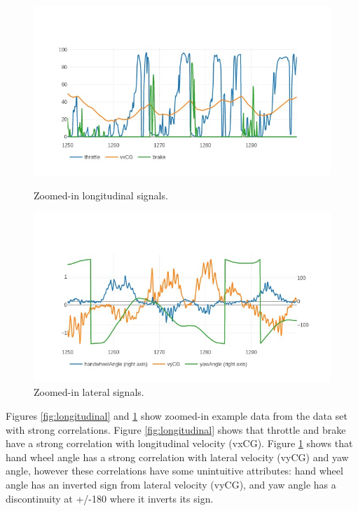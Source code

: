 \documentclass{article}
\begin{document}
\begin{figure}[h!]
  \centering
  \begin{minipage}[b]{0.49\textwidth}
    \includegraphics[width=\textwidth]{20130810_01_01_01_grandsport-12500-13000-1-cd12f64.jpeg}
    \caption{Zoomed-in longitudinal signals.}
    \label{fig:longitudinal}
  \end{minipage}
  \hfill
  \begin{minipage}[b]{0.49\textwidth}
    \includegraphics[width=\textwidth]{20130810_01_01_01_grandsport-12500-13000-1-9103b57}
    \caption{Zoomed-in lateral signals.}
    \label{fig:lateral}
  \end{minipage}
\end{figure}

Figures \ref{fig:longitudinal} and \ref{fig:lateral} show zoomed-in example data from the data set with strong correlations. Figure \ref{fig:longitudinal} shows that throttle and brake have a strong correlation with longitudinal velocity (vxCG). Figure \ref{fig:lateral} shows that hand wheel angle has a strong correlation with lateral velocity (vyCG) and yaw angle, however these correlations have some unintuitive attributes: hand wheel angle has an inverted sign from lateral velocity (vyCG), and yaw angle has a discontinuity at +/-180 where it inverts its sign.
\end{document}
